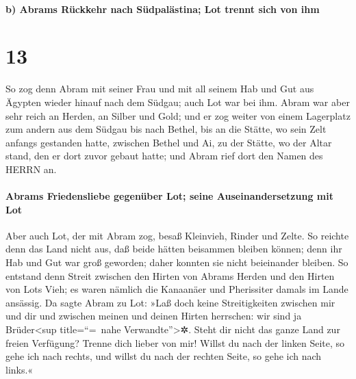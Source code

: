 \hypertarget{b-abrams-ruxfcckkehr-nach-suxfcdpaluxe4stina-lot-trennt-sich-von-ihm}{%
\paragraph{b) Abrams Rückkehr nach Südpalästina; Lot trennt sich von
ihm}\label{b-abrams-ruxfcckkehr-nach-suxfcdpaluxe4stina-lot-trennt-sich-von-ihm}}

\hypertarget{section-12}{%
\section{13}\label{section-12}}

 So zog denn Abram mit seiner Frau und mit all seinem Hab
und Gut aus Ägypten wieder hinauf nach dem Südgau; auch Lot war bei ihm.
 Abram war aber sehr reich an Herden, an Silber und Gold;
 und er zog weiter von einem Lagerplatz zum andern aus dem
Südgau bis nach Bethel, bis an die Stätte, wo sein Zelt anfangs
gestanden hatte, zwischen Bethel und Ai,  zu der Stätte,
wo der Altar stand, den er dort zuvor gebaut hatte; und Abram rief dort
den Namen des HERRN an.

\hypertarget{abrams-friedensliebe-gegenuxfcber-lot-seine-auseinandersetzung-mit-lot}{%
\paragraph{Abrams Friedensliebe gegenüber Lot; seine Auseinandersetzung
mit
Lot}\label{abrams-friedensliebe-gegenuxfcber-lot-seine-auseinandersetzung-mit-lot}}

 Aber auch Lot, der mit Abram zog, besaß Kleinvieh, Rinder
und Zelte.  So reichte denn das Land nicht aus, daß beide
hätten beisammen bleiben können; denn ihr Hab und Gut war groß geworden;
daher konnten sie nicht beieinander bleiben.  So entstand
denn Streit zwischen den Hirten von Abrams Herden und den Hirten von
Lots Vieh; es waren nämlich die Kanaanäer und Pherissiter damals im
Lande ansässig.  Da sagte Abram zu Lot: »Laß doch keine
Streitigkeiten zwischen mir und dir und zwischen meinen und deinen
Hirten herrschen: wir sind ja Brüder\textless sup title=``=~nahe
Verwandte''\textgreater✲.  Steht dir nicht das ganze Land
zur freien Verfügung? Trenne dich lieber von mir! Willst du nach der
linken Seite, so gehe ich nach rechts, und willst du nach der rechten
Seite, so gehe ich nach links.«

